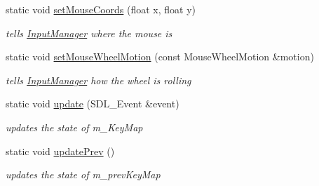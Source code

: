 \begin{DoxyCompactItemize}
\mbox{\label{classnta_1_1InputManager_a42590ba480b5fd5280cbc69732bb025f}} 
static void \hyperlink{classnta_1_1InputManager_a42590ba480b5fd5280cbc69732bb025f}{set\+Mouse\+Coords} (float x, float y)
\begin{DoxyCompactList}\small\item\em tells \hyperlink{classnta_1_1InputManager}{Input\+Manager} where the mouse is \end{DoxyCompactList}\item 
\mbox{\label{classnta_1_1InputManager_a716c722f10dfe636b79384087bbf1a6e}} 
static void \hyperlink{classnta_1_1InputManager_a716c722f10dfe636b79384087bbf1a6e}{set\+Mouse\+Wheel\+Motion} (const Mouse\+Wheel\+Motion \&motion)
\begin{DoxyCompactList}\small\item\em tells \hyperlink{classnta_1_1InputManager}{Input\+Manager} how the wheel is rolling \end{DoxyCompactList}\item 
\mbox{\label{classnta_1_1InputManager_a7c555e0a2ce37af042b5016140414f18}} 
static void \hyperlink{classnta_1_1InputManager_a7c555e0a2ce37af042b5016140414f18}{update} (S\+D\+L\+\_\+\+Event \&event)
\begin{DoxyCompactList}\small\item\em updates the state of m\+\_\+\+Key\+Map \end{DoxyCompactList}\item 
\mbox{\label{classnta_1_1InputManager_aea4219a830a2b1d9ee87bdc5f954903d}} 
static void \hyperlink{classnta_1_1InputManager_aea4219a830a2b1d9ee87bdc5f954903d}{update\+Prev} ()
\begin{DoxyCompactList}\small\item\em updates the state of m\+\_\+prev\+Key\+Map \end{DoxyCompactList}\end{DoxyCompactItemize}
